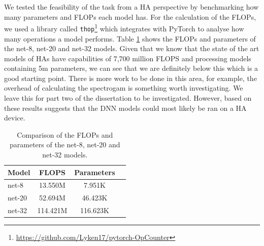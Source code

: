 \documentclass[logo,bsc,singlespacing,parskip,online]{infthesis}
\begin{document}
We tested the feasibility of the task from a HA perspective by benchmarking 
how many parameters and FLOPs each model has. For the calculation of the FLOPs, 
we used a library called \texttt{thop}\footnote{\url{https://github.com/Lyken17/pytorch-OpCounter}} 
which integrates with PyTorch to analyse how many operations a model performs. 
Table \ref{tab:model-comparison} shows the FLOPs and parameters of the net-8, net-20 and net-32 models.
Given that we know that the state of the art models of HAs have capabilities of 
7,700 million FLOPS and processing models containing 5m parameters, 
we can see that we are definitely below this which is a good starting point. 
There is more work to be done in this area, for example, the overhead 
of calculating the spectrogam is something worth investigating. We leave this 
for part two of the dissertation to be investigated. However, based on these 
results suggests that the DNN models could most likely be ran on a HA device.

\begin{table}[h]
   \centering
   \begin{tabular}{lccc}
      \toprule
      Model & FLOPS & Parameters \\
      \midrule
      net-8 & 13.550M & 7.951K \\
      net-20 & 52.694M & 46.423K \\
      net-32 & 114.421M & 116.623K \\
      \bottomrule
   \end{tabular}
   \caption{Comparison of the FLOPs and parameters of the net-8, net-20 and net-32 models.}
   \label{tab:model-comparison}
\end{table}

\end{document}
